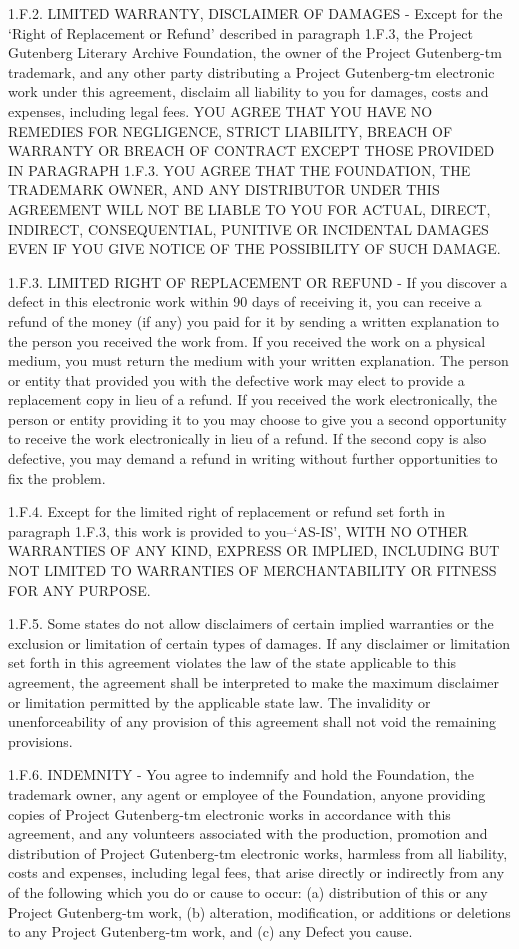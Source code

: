 \documentclass[oneside]{book}
\begin{document}
\begin{text}
1.F.2. LIMITED WARRANTY, DISCLAIMER OF DAMAGES - Except for the `Right
of Replacement or Refund' described in paragraph 1.F.3, the Project
Gutenberg Literary Archive Foundation, the owner of the Project
Gutenberg-tm trademark, and any other party distributing a Project
Gutenberg-tm electronic work under this agreement, disclaim all
liability to you for damages, costs and expenses, including legal
fees. YOU AGREE THAT YOU HAVE NO REMEDIES FOR NEGLIGENCE, STRICT
LIABILITY, BREACH OF WARRANTY OR BREACH OF CONTRACT EXCEPT THOSE
PROVIDED IN PARAGRAPH 1.F.3. YOU AGREE THAT THE FOUNDATION, THE
TRADEMARK OWNER, AND ANY DISTRIBUTOR UNDER THIS AGREEMENT WILL NOT BE
LIABLE TO YOU FOR ACTUAL, DIRECT, INDIRECT, CONSEQUENTIAL, PUNITIVE OR
INCIDENTAL DAMAGES EVEN IF YOU GIVE NOTICE OF THE POSSIBILITY OF SUCH
DAMAGE.

1.F.3. LIMITED RIGHT OF REPLACEMENT OR REFUND - If you discover a
defect in this electronic work within 90 days of receiving it, you can
receive a refund of the money (if any) you paid for it by sending a
written explanation to the person you received the work from. If you
received the work on a physical medium, you must return the medium
with your written explanation. The person or entity that provided you
with the defective work may elect to provide a replacement copy in
lieu of a refund. If you received the work electronically, the person
or entity providing it to you may choose to give you a second
opportunity to receive the work electronically in lieu of a refund. If
the second copy is also defective, you may demand a refund in writing
without further opportunities to fix the problem.

1.F.4. Except for the limited right of replacement or refund set forth
in paragraph 1.F.3, this work is provided to you--`AS-IS', WITH NO
OTHER WARRANTIES OF ANY KIND, EXPRESS OR IMPLIED, INCLUDING BUT NOT
LIMITED TO WARRANTIES OF MERCHANTABILITY OR FITNESS FOR ANY PURPOSE.

1.F.5. Some states do not allow disclaimers of certain implied
warranties or the exclusion or limitation of certain types of
damages. If any disclaimer or limitation set forth in this agreement
violates the law of the state applicable to this agreement, the
agreement shall be interpreted to make the maximum disclaimer or
limitation permitted by the applicable state law. The invalidity or
unenforceability of any provision of this agreement shall not void the
remaining provisions.

1.F.6. INDEMNITY - You agree to indemnify and hold the Foundation, the
trademark owner, any agent or employee of the Foundation, anyone
providing copies of Project Gutenberg-tm electronic works in
accordance with this agreement, and any volunteers associated with the
production, promotion and distribution of Project Gutenberg-tm
electronic works, harmless from all liability, costs and expenses,
including legal fees, that arise directly or indirectly from any of
the following which you do or cause to occur: (a) distribution of this
or any Project Gutenberg-tm work, (b) alteration, modification, or
additions or deletions to any Project Gutenberg-tm work, and (c) any
Defect you cause.


\end{text}
\end{document}

